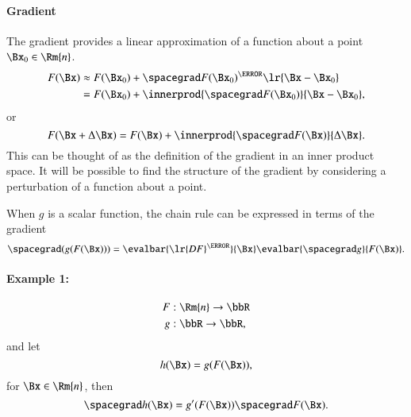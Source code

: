 \paragraph{Gradient}

The gradient provides a linear approximation of a function about a point \( \Bx_0 \in \Rm{n} \).
%
\begin{equation}\label{eqn:jacobianAndHessian:484}
\begin{aligned}
F(\Bx)
&\approx F(\Bx_0) + \spacegrad F(\Bx_0)^\T \lr{ \Bx - \Bx_0 } \\
&= F(\Bx_0) + \innerprod{ \spacegrad F(\Bx_0)}{ \Bx - \Bx_0 },
\end{aligned}
\end{equation}
%
or
\begin{equation}\label{eqn:jacobianAndHessian:504}
F(\Bx + \Delta \Bx)
=
F(\Bx) + \innerprod{ \spacegrad F(\Bx)}{ \Delta \Bx }.
\end{equation}
%
This can be thought of as the definition of the gradient in an inner product space.  It will be possible to find the structure of the gradient by considering a perturbation of a function about a point.

When \( g \) is a scalar function, the chain rule can be expressed in terms of the gradient
%
\begin{equation}\label{eqn:jacobianAndHessian:724}
\spacegrad
(g(F(\Bx)))
=
\evalbar{\lr{
D F
}^\T}{\Bx}
\evalbar{\spacegrad g}{F(\Bx)}.
\end{equation}
%

\paragraph{Example 1:}
%
\begin{equation}\label{eqn:jacobianAndHessian:524}
\begin{aligned}
F &: \Rm{n} \rightarrow \bbR \\
g &: \bbR \rightarrow \bbR,
\end{aligned}
\end{equation}
%
and let
%
\begin{equation}\label{eqn:jacobianAndHessian:544}
h(\Bx) = g(F(\Bx)),
\end{equation}
%
for \( \Bx \in \Rm{n} \), then
%
\begin{equation}\label{eqn:jacobianAndHessian:564}
\spacegrad h(\Bx)
=
g'(F(\Bx)) \spacegrad F(\Bx).
\end{equation}
%


